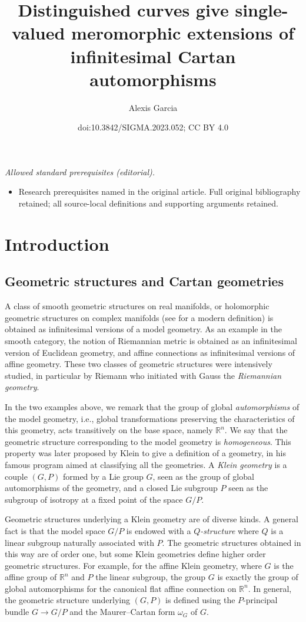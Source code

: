 \documentclass[10pt,a4paper]{amsart}
\title{Distinguished curves give single-valued meromorphic extensions of infinitesimal Cartan automorphisms}
\author{Alexis Garcia}
\date{doi:10.3842/SIGMA.2023.052; CC BY 4.0}
\numberwithin{equation}{section}
\begin{document}
\maketitle
\noindent\textit{Allowed standard prerequisites (editorial).}\begin{itemize}
\item Research prerequisites named in the original article. Full original bibliography retained; all source-local definitions and supporting arguments retained.
\end{itemize}\medskip
\section{Introduction}

\subsection{Geometric structures and Cartan geometries}
A class of smooth geometric structures on real manifolds, or holomorphic geometric structures on complex manifolds (see \cite[p.~65]{Gromov} for a modern definition) is obtained as infinitesimal versions of a model geometry. As an example in the smooth category, the notion of Riemannian metric is obtained as an infinitesimal version of Euclidean geometry, and affine connections as infinitesimal versions of affine geometry. These two classes of geometric structures were intensively studied, in particular by Riemann who initiated with Gauss the \textit{Riemannian geometry}.

In the two examples above, we remark that the group of global \textit{automorphisms} of the model geometry, i.e., global transformations preserving the characteristics of this geometry, acts transitively on the base space, namely $\mathbb{R}^n$. We say that the geometric structure corresponding to the model geometry is \textit{homogeneous}. This property was later proposed by Klein to give 	a definition of a geometry, in his famous program aimed at classifying all the geometries. A \textit{Klein geometry} is a couple $(G,P)$ formed by a Lie group $G$, seen as the group of global automorphisms of the geometry, and a closed Lie subgroup $P$ seen as the subgroup of isotropy at a fixed point of the space $G/P$.

Geometric structures underlying a Klein geometry are of diverse kinds. A general fact is that the model space $G/P$ is endowed with a \textit{$Q$-structure} where $Q$ is a linear subgroup naturally associated with $P$. The geometric structures obtained in this way are of order one, but some Klein geometries define higher order geometric structures. For example, for the affine Klein geometry, where $G$ is the affine group of $\mathbb{R}^n$ and $P$ the linear subgroup, the group $G$ is exactly the group of global automorphisms for the canonical flat affine connection on $\mathbb{R}^n$. In general, the geometric structure underlying $(G,P)$ is defined using the $P$-principal bundle $G\longrightarrow G/P$ and the Maurer--Cartan form $\omega_G$ of $G$.
\end{document}
